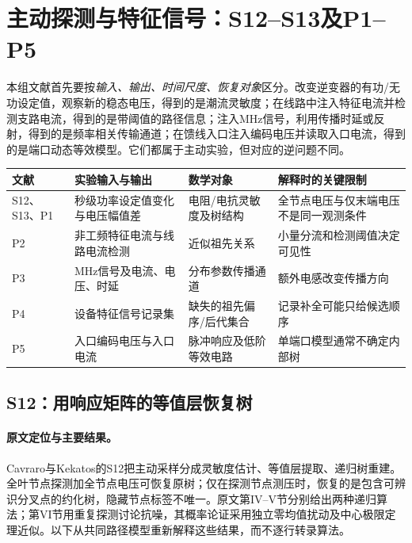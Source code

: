 \section{主动探测与特征信号：S12--S13及P1--P5}
\label{sec:probing-detailed}

本组文献首先要按\emph{输入、输出、时间尺度、恢复对象}区分。改变逆变器的有功/无功设定值，观察新的稳态电压，得到的是潮流灵敏度；在线路中注入特征电流并检测支路电流，得到的是带阈值的路径信息；注入MHz信号，利用传播时延或反射，得到的是频率相关传输通道；在馈线入口注入编码电压并读取入口电流，得到的是端口动态等效模型。它们都属于主动实验，但对应的逆问题不同。

\begin{center}
\small
\begin{tabularx}{\textwidth}{@{}lXXX@{}}
\toprule
文献 & 实验输入与输出 & 数学对象 & 解释时的关键限制\\
\midrule
S12、S13、P1 & 秒级功率设定值变化与电压幅值差 & 电阻/电抗灵敏度及树结构 & 全节点电压与仅末端电压不是同一观测条件\\
P2 & 非工频特征电流与线路电流检测 & 近似祖先关系 & 小量分流和检测阈值决定可见性\\
P3 & MHz信号及电流、电压、时延 & 分布参数传播通道 & 额外电感改变传播方向\\
P4 & 设备特征信号记录集 & 缺失的祖先偏序/后代集合 & 记录补全可能只给候选顺序\\
P5 & 入口编码电压与入口电流 & 脉冲响应及低阶等效电路 & 单端口模型通常不确定内部树\\
\bottomrule
\end{tabularx}
\end{center}

\subsection{S12：用响应矩阵的等值层恢复树}
\label{subsec:S12}

\paragraph{原文定位与主要结果。}
Cavraro与Kekatos的S12\citep{S12}把主动采样分成灵敏度估计、等值层提取、递归树重建。全叶节点探测加全节点电压可恢复原树；仅在探测节点测压时，恢复的是包含可辨识分叉点的约化树，隐藏节点标签不唯一。原文第IV--V节分别给出两种递归算法；第VI节用重复探测讨论抗噪，其概率论证采用独立零均值扰动及中心极限定理近似。以下从共同路径模型重新解释这些结果，而不逐行转录算法。

